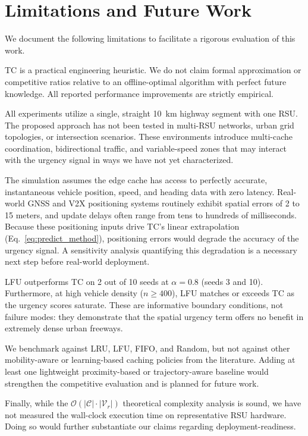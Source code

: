 \documentclass[preprint,12pt]{elsarticle}
\begin{document}
	\section{Limitations and Future Work}

	\label{sec:limitations}
	
	We document the following limitations to facilitate a rigorous evaluation of this work.
	
	TC is a practical engineering heuristic. We do not claim formal approximation or competitive ratios relative to an offline-optimal algorithm with perfect future knowledge. All reported performance improvements are strictly empirical.
	
	All experiments utilize a single, straight 10~km highway segment with one RSU. The proposed approach has not been tested in multi-RSU networks, urban grid topologies, or intersection scenarios. These environments introduce multi-cache coordination, bidirectional traffic, and variable-speed zones that may interact with the urgency signal in ways we have not yet characterized.
	
	The simulation assumes the edge cache has access to perfectly accurate, instantaneous vehicle position, speed, and heading data with zero latency. Real-world GNSS and V2X positioning systems routinely exhibit spatial errors of 2 to 15 meters, and update delays often range from tens to hundreds of milliseconds. Because these positioning inputs drive TC's linear extrapolation (Eq.~\ref{eq:predict_method}), positioning errors would degrade the accuracy of the urgency signal. A sensitivity analysis quantifying this degradation is a necessary next step before real-world deployment.
	
	LFU outperforms TC on 2 out of 10 seeds at $\alpha=0.8$ (seeds 3 and 10). Furthermore, at high vehicle density ($n \geq 400$), LFU matches or exceeds TC as the urgency scores saturate. These are informative boundary conditions, not failure modes: they demonstrate that the spatial urgency term offers no benefit in extremely dense urban freeways. 
	
	We benchmark against LRU, LFU, FIFO, and Random, but not against other mobility-aware or learning-based caching policies from the literature. Adding at least one lightweight proximity-based or trajectory-aware baseline would strengthen the competitive evaluation and is planned for future work.
	
	Finally, while the $\mathcal{O}(|\mathcal{C}| \cdot |\mathcal{V}_r|)$ theoretical complexity analysis is sound, we have not measured the wall-clock execution time on representative RSU hardware. Doing so would further substantiate our claims regarding deployment-readiness.
\end{document}
